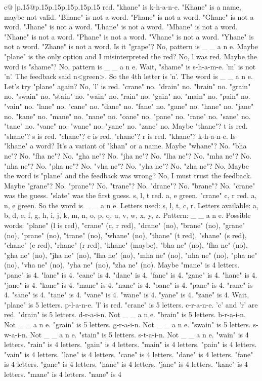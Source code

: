 \documentclass{article}
\begin{document}
{\begin{supertabular}{c@{$\;$}|p{.15\linewidth}@{}p{.15\linewidth}p{.15\linewidth}p{.15\linewidth}p{.15\linewidth}p{.15\linewidth}}
{{{red. "khane" is k{-}h{-}a{-}n{-}e. "Khane" is a name, maybe not valid. "Bhane" is not a word. "Fhane" is not a word. "Ghane" is not a word. "Jhane" is not a word. "Lhane" is not a word. "Mhane" is not a word. "Nhane" is not a word. "Phane" is not a word. "Vhane" is not a word. "Yhane" is not a word. "Zhane" is not a word. Is it "grape"? No, pattern is \_ \_ a n e. Maybe "plane" is the only option and I misinterpreted the red? No, l was red. Maybe the word is "shame"? No, pattern is \_ \_ a n e. Wait, "shame" is s{-}h{-}a{-}m{-}e. 'm' is not 'n'. The feedback said n<green>. So the 4th letter is 'n'. The word is \_ \_ a n e. Let's try "plane" again? No, 'l' is red. "crane" no. "drain" no. "brain" no. "grain" no. "swain" no. "stain" no. "wain" no. "rain" no. "gain" no. "main" no. "pain" no. "vain" no. "lane" no. "cane" no. "dane" no. "fane" no. "gane" no. "hane" no. "jane" no. "kane" no. "mane" no. "nane" no. "oane" no. "pane" no. "rane" no. "sane" no. "tane" no. "vane" no. "wane" no. "yane" no. "zane" no. Maybe "thane"? t is red. "shane"? s is red. "chane"? c is red. "rhane"? r is red. "khane"? k{-}h{-}a{-}n{-}e. Is "khane" a word? It's a variant of "khan" or a name. Maybe "whane"? No. "bha ne"? No. "fha ne"? No. "gha ne"? No. "jha ne"? No. "lha ne"? No. "mha ne"? No. "nha ne"? No. "pha ne"? No. "vha ne"? No. "yha ne"? No. "zha ne"? No. Maybe the word is "plane" and the feedback was wrong? No, I must trust the feedback. Maybe "grane"? No. "prane"? No. "trane"? No. "drane"? No. "brane"? No. "crane" was the guess. "slate" was the first guess. s, l, t red. a, e green. "crane" c, r red. a, n, e green. So the word is \_ \_ a n e. Letters used: s, l, t, c, r. Letters available: a, b, d, e, f, g, h, i, j, k, m, n, o, p, q, u, v, w, x, y, z. Pattern: \_ \_ a n e. Possible words: "plane" (l is red), "crane" (c, r red), "drane" (no), "brane" (no), "grane" (no), "prane" (no), "trane" (no), "whane" (no), "thane" (t red), "shane" (s red), "chane" (c red), "rhane" (r red), "khane" (maybe), "bha ne" (no), "fha ne" (no), "gha ne" (no), "jha ne" (no), "lha ne" (no), "mha ne" (no), "nha ne" (no), "pha ne" (no), "vha ne" (no), "yha ne" (no), "zha ne" (no). Maybe "mane" is 4 letters. "pane" is 4. "lane" is 4. "cane" is 4. "dane" is 4. "fane" is 4. "gane" is 4. "hane" is 4. "jane" is 4. "kane" is 4. "mane" is 4. "nane" is 4. "oane" is 4. "pane" is 4. "rane" is 4. "sane" is 4. "tane" is 4. "vane" is 4. "wane" is 4. "yane" is 4. "zane" is 4. Wait, "plane" is 5 letters. p{-}l{-}a{-}n{-}e. 'l' is red. "crane" is 5 letters. c{-}r{-}a{-}n{-}e. 'c' and 'r' are red. "drain" is 5 letters. d{-}r{-}a{-}i{-}n. Not \_ \_ a n e. "brain" is 5 letters. b{-}r{-}a{-}i{-}n. Not \_ \_ a n e. "grain" is 5 letters. g{-}r{-}a{-}i{-}n. Not \_ \_ a n e. "swain" is 5 letters. s{-}w{-}a{-}i{-}n. Not \_ \_ a n e. "stain" is 5 letters. s{-}t{-}a{-}i{-}n. Not \_ \_ a n e. "wain" is 4 letters. "rain" is 4 letters. "gain" is 4 letters. "main" is 4 letters. "pain" is 4 letters. "vain" is 4 letters. "lane" is 4 letters. "cane" is 4 letters. "dane" is 4 letters. "fane" is 4 letters. "gane" is 4 letters. "hane" is 4 letters. "jane" is 4 letters. "kane" is 4 letters. "mane" is 4 letters. "nane" is 4 }}}
\end{supertabular}}
\end{document}
